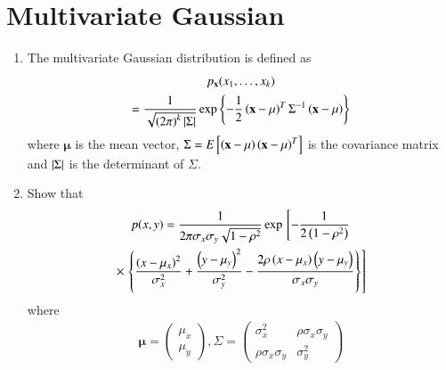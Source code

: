 \documentclass[journal,12pt,twocolumn]{IEEEtran}
\renewcommand\thesection{\arabic{section}}
\begin{document}
%
\IEEEpeerreviewmaketitle


\section{Multivariate Gaussian}
\begin{enumerate}[label=\thesection.\arabic*
,ref=\thesection.\theenumi]

\item The multivariate Gaussian distribution is defined as
%
\begin{multline}
p_{\mathbf{x}}(x_1,\dots,x_k)
\\
=\frac{1}{\sqrt{\left(2\pi\right)^k\left\vert\Sigma\right\vert}}\exp\left\{-\frac{1}{2}\left(\mathbf{x}-\mathbf{\mu}\right)^T\Sigma^{-1}\left(\mathbf{x}-\mathbf{\mu}\right)\right\}
\end{multline}
%
where $\mathbf{\mu}$ is the mean vector, $\Sigma = E{}\left[\left(\mathbf{x}-\mathbf{\mu}\right)\left(\mathbf{x}-\mathbf{\mu}\right)^T\right]$ is the covariance matrix and $\left\vert\Sigma\right\vert$ is the determinant of $\Sigma$.
\item Show that
\begin{multline}
p(x,y)= \frac{1}{2\pi \sigma_x\sigma_y\sqrt{1-\rho^2}}\exp{}\left[-\frac{1}{2\left(1-\rho^2\right)}\right.
\\
\times {}\left.\left\{\frac{\left(x-\mu_x\right)^2}{\sigma_x^2}+\frac{\left(y-\mu_y\right)^2}{\sigma_y^2}-\frac{2\rho\left(x-\mu_x\right)\left(y-\mu_y\right)}{\sigma_x\sigma_y}\right\}\right]
\end{multline}
%
where
%
\begin{align}
\mathbf{\mu}=
\begin{pmatrix*}
\mu_x \\
\mu_y
\end{pmatrix*},
\Sigma = 
\begin{pmatrix*}%
\sigma_x^2 & \rho\sigma_x\sigma_y \\
\rho\sigma_x\sigma_y & \sigma_y^2
\end{pmatrix*}
\end{align}
%






\end{enumerate}
\end{document}
